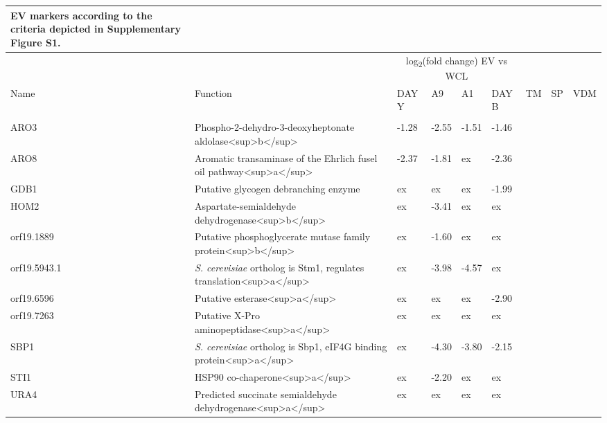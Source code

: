 \begin{ThreePartTable}
\begin{longtable}[t]{lllllllll}
{              EV markers according to the criteria depicted in 
              Supplementary Figure S1.}\\
\toprule
\multicolumn{2}{c}{ } & \multicolumn{4}{c}{log\textsubscript{2}(fold change) EV vs WCL} & \multicolumn{3}{c}{ } \\
\cmidrule(l{3pt}r{3pt}){3-6}
Name & Function & DAY Y & A9 & A1 & DAY B & TM & SP & VDM\\
\midrule
\addlinespace[0.3em]
\multicolumn{9}{l}{\textbf{Cytoplasm}}\\
\hspace{1em}ARO3 & Phospho-2-dehydro-3-deoxyheptonate aldolase<sup>b</sup> & -1.28 & -2.55 & -1.51 & -1.46 &  &  & \\
\hspace{1em}ARO8 & Aromatic transaminase of the Ehrlich fusel oil pathway<sup>a</sup> & -2.37 & -1.81 & ex & -2.36 &  &  & \\
\hspace{1em}GDB1 & Putative glycogen debranching enzyme & ex & ex & ex & -1.99 &  &  & \\
\hspace{1em}HOM2 & Aspartate-semialdehyde dehydrogenase<sup>b</sup> & ex & -3.41 & ex & ex &  &  & \\
\hspace{1em}orf19.1889 & Putative phosphoglycerate mutase family protein<sup>b</sup> & ex & -1.60 & ex & ex &  &  & \\
\hspace{1em}orf19.5943.1 & \textit{S. cerevisiae} ortholog is Stm1, regulates translation<sup>a</sup> & ex & -3.98 & -4.57 & ex &  &  & \\
\hspace{1em}orf19.6596 & Putative esterase<sup>a</sup> & ex & ex & ex & -2.90 &  &  & \\
\hspace{1em}orf19.7263 & Putative X-Pro aminopeptidase<sup>a</sup> & ex & ex & ex & ex &  &  & \\
\hspace{1em}SBP1 & \textit{S. cerevisiae} ortholog is Sbp1, eIF4G binding protein<sup>a</sup> & ex & -4.30 & -3.80 & -2.15 &  &  & \\
\hspace{1em}STI1 & HSP90 co-chaperone<sup>a</sup> & ex & -2.20 & ex & ex &  &  & \\
\hspace{1em}URA4 & Predicted succinate semialdehyde dehydrogenase<sup>a</sup> & ex & ex & ex & ex &  &  & \\

\end{longtable}
\end{ThreePartTable}
